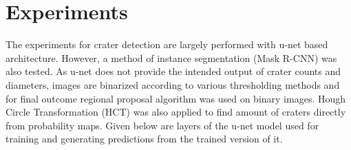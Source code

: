 \documentclass[11pt]{article}
\begin{document}

\section{Experiments}
The experiments for crater detection are largely performed with u-net based architecture. However, a method of instance segmentation (Mask R-CNN) was also tested. As u-net does not provide the intended output of crater counts and diameters, images are binarized according to various thresholding methods and for final outcome regional proposal algorithm was used on binary images. Hough Circle Transformation (HCT) was also applied to find amount of craters directly from probability maps. Given below are layers of the u-net model used for training and generating predictions from the trained version of it.
\end{document}
